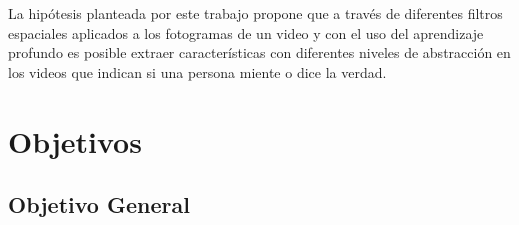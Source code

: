 \begin{onehalfspacing}
La hipótesis planteada por este trabajo propone que a través de diferentes filtros espaciales aplicados a los fotogramas de un video y con el uso del aprendizaje profundo es posible extraer características con diferentes niveles de abstracción en los videos que indican si una persona miente o dice la verdad.\\




\section{Objetivos}
\label{sec:Objetivos}
\subsection{Objetivo General}
\label{subsec:Objetivo_General}





\end{onehalfspacing}
